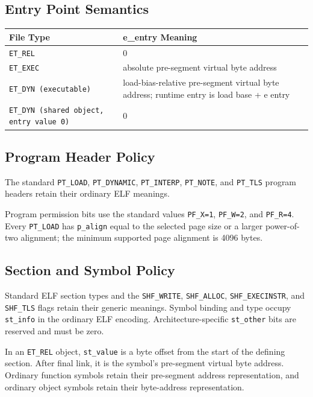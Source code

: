 \documentclass[10pt,twoside]{article}
\begin{document}
\subsection{Entry Point Semantics}
\begingroup\footnotesize
\setlength{\tabcolsep}{2pt}
\begin{longtable}{@{}p{1.75in}p{3.75in}@{}}
\toprule
\textbf{File Type} & \textbf{e\_entry Meaning}\\
\midrule
\endhead
\texttt{ET\_\allowbreak{}REL} & 0\\
\texttt{ET\_\allowbreak{}EXEC} & absolute pre-segment virtual byte address\\
\texttt{ET\_\allowbreak{}DYN (executable)} & load-bias-relative pre-segment virtual byte address; runtime entry is load base + e entry\\
\texttt{ET\_\allowbreak{}DYN (shared object, entry value 0)} & 0\\
\bottomrule
\end{longtable}
\endgroup
\subsection{Program Header Policy}
The standard \texttt{PT\_LOAD}, \texttt{PT\_DYNAMIC},
\texttt{PT\_INTERP}, \texttt{PT\_NOTE}, and \texttt{PT\_TLS} program
headers retain their ordinary ELF meanings.

Program permission bits use the standard values \texttt{PF\_X=1},
\texttt{PF\_W=2}, and \texttt{PF\_R=4}. Every \texttt{PT\_LOAD} has
\texttt{p\_align} equal to the selected page size or a larger power-of-two
alignment; the minimum supported page alignment is 4096 bytes.

\subsection{Section and Symbol Policy}\label{section:section-and-symbol-policy}
Standard ELF section types and the \texttt{SHF\_WRITE},
\texttt{SHF\_ALLOC}, \texttt{SHF\_EXECINSTR}, and \texttt{SHF\_TLS} flags
retain their generic meanings. Symbol binding and type occupy
\texttt{st\_info} in the ordinary ELF encoding. Architecture-specific
\texttt{st\_other} bits are reserved and must be zero.

In an \texttt{ET\_REL} object, \texttt{st\_value} is a byte offset from the
start of the defining section. After final link, it is the symbol's
pre-segment virtual byte address. Ordinary function symbols retain their
pre-segment address representation, and ordinary object symbols retain their
byte-address representation.
\end{document}
